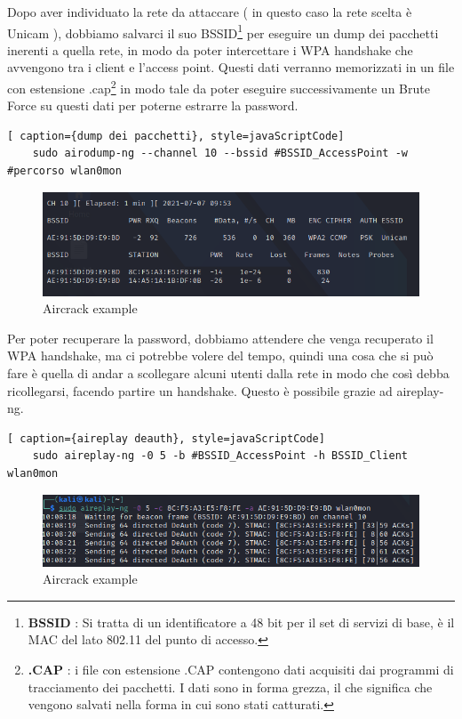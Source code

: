\newpage

Dopo aver individuato la rete da attaccare ( in questo caso la rete scelta è Unicam ), dobbiamo salvarci il suo BSSID\footnote[1]{\textbf{BSSID} : Si tratta di un identificatore a 48 bit per il set di servizi di base, è il MAC del lato 802.11 del punto di accesso.} per eseguire un dump dei pacchetti inerenti a quella rete, in modo da poter intercettare i WPA handshake che avvengono tra i client e l'access point. Questi dati verranno memorizzati in un file con estensione .cap\footnote[1]{\textbf{.CAP} : i file con estensione .CAP contengono dati acquisiti dai programmi di tracciamento dei pacchetti. I dati sono in forma grezza, il che significa che vengono salvati nella forma in cui sono stati catturati.} in modo tale da poter eseguire successivamente un Brute Force su questi dati per poterne estrarre la password.

\begin{lstlisting}[ caption={dump dei pacchetti}, style=javaScriptCode]
	sudo airodump-ng --channel 10 --bssid #BSSID_AccessPoint -w #percorso wlan0mon
\end{lstlisting}

\begin{figure}[ht]
    \centering
    \includegraphics[width=\linewidth]{Immagini/6/aircrack_4.png}
    \caption{Aircrack example}
    \label{fig:Aircrack example}
\end{figure}

Per poter recuperare la password, dobbiamo attendere che venga recuperato il WPA handshake, ma ci potrebbe volere del tempo, quindi una cosa che si può fare è quella di andar a scollegare alcuni utenti dalla rete in modo che così debba ricollegarsi, facendo partire un handshake. Questo è possibile grazie ad aireplay-ng.

\begin{lstlisting}[ caption={aireplay deauth}, style=javaScriptCode]
	sudo aireplay-ng -0 5 -b #BSSID_AccessPoint -h BSSID_Client wlan0mon
\end{lstlisting}

\begin{figure}[ht]
    \centering
    \includegraphics[width=\linewidth]{Immagini/6/aircrack_7.png}
    \caption{Aircrack example}
    \label{fig:Aircrack example}
\end{figure}

